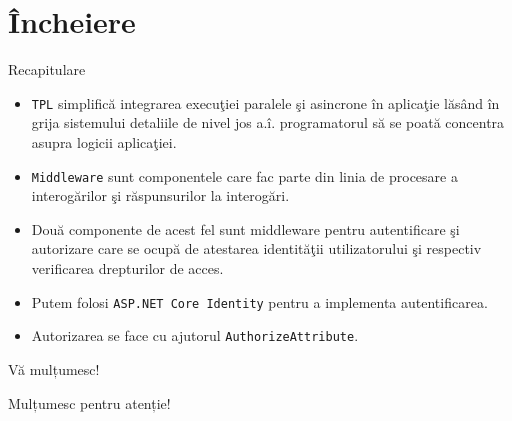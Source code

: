 \documentclass[presentation]{beamer}
\begin{document}
\section{Încheiere}
\label{sec:orgc014d54}
\begin{frame}[label={sec:orga50b1a9},fragile]{Recapitulare}
 \begin{itemize}
\item \texttt{TPL} simplifică integrarea execuţiei paralele şi asincrone în aplicaţie lăsând în grija sistemului detaliile de nivel jos a.î. programatorul să se poată concentra asupra logicii aplicaţiei.
\item \texttt{Middleware} sunt componentele care fac parte din linia de procesare a interogărilor şi răspunsurilor la interogări.
\item Două componente de acest fel sunt middleware pentru autentificare şi autorizare care se ocupă de atestarea identităţii utilizatorului şi respectiv verificarea drepturilor de acces.
\item Putem folosi \texttt{ASP.NET Core Identity} pentru a implementa autentificarea.
\item Autorizarea se face cu ajutorul \texttt{AuthorizeAttribute}.
\end{itemize}
\end{frame}
\begin{frame}[label={sec:orgbab7935}]{Vă mulțumesc!}
\begin{center}
Mulțumesc pentru atenție!
\end{center}
\end{frame}
\end{document}
